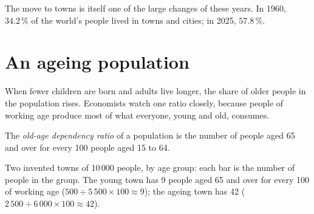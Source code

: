 The move to towns is itself one of the large changes of these years. In 1960,
$34.2\,\%$ of the world's people lived in towns and cities; in 2025, $57.8\,\%$.

\section{An ageing population}

When fewer children are born and adults live longer, the share of older people
in the population rises. Economists watch one ratio closely, because people of
working age produce most of what everyone, young and old, consumes.

\begin{definition}\label{def:g6:health-and-population:old-age-dependency}
The \emph{old-age dependency ratio} of a
population is the number of people aged 65 and over for every 100 people aged
15 to 64.
\end{definition}

\begin{omfigure}

{\small Two invented towns of 10\,000 people, by age group: each bar is the
number of people in the group. The young town has 9 people aged 65 and over for
every 100 of working age ($500 \div 5\,500 \times 100 \approx 9$); the ageing
town has 42 ($2\,500 \div 6\,000 \times 100 \approx 42$).}
\end{omfigure}


